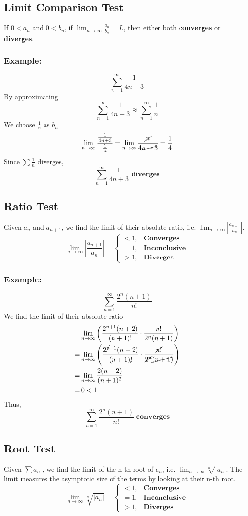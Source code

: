 \documentclass[11pt]{article}
\begin{document}
\subsection{Limit Comparison Test}
If $0<a_n$ and $0<b_n$, if $\displaystyle\lim_{n\to\infty}\frac{a_n}{b_n}=L$, then either both \textbf{converges} or \textbf{diverges}.
\subsubsection*{Example:}
\[
  \sum_{n=1}^\infty \frac{1}{4n+3}
\]
By approximating
\[
  \displaystyle\sum_{n=1}^\infty \frac{1}{4n+3} \approx \sum_{n=1}^\infty \frac{1}{n}
\]
We choose $\displaystyle\frac{1}{n}$ as $b_n$
\[
  \lim_{n\to\infty} \frac{\frac{1}{4n+3}}{\frac{1}{n}}=\lim_{n\to\infty}\frac{\cancel{n}}{4\cancel{n+3}}=\frac{1}{4}
\]
Since $\displaystyle\sum\frac{1}{n}$ diverges,
\[
  \sum_{n=1}^\infty \frac{1}{4n+3}\textbf{ diverges}
\]
\subsection{Ratio Test}
Given $a_n$ and $a_{n+1}$, we find the limit of their absolute ratio, i.e. $\displaystyle\lim_{n\to\infty}\left|\frac{a_{n+1}}{a_n}\right|$. 
\[
  \lim_{n\to\infty}\left|\frac{a_{n+1}}{a_n}\right|=
  \begin{cases}
    <1, &\textbf{Converges}\\
    =1, &\textbf{Inconclusive}\\
    >1, &\textbf{Diverges}
  \end{cases}
\]
\subsubsection*{Example:}
\[
  \sum_{n=1}^\infty \frac{2^n(n+1)}{n!}
\]
We find the limit of their absolute ratio
\[
  \begin{aligned}
    &\lim_{n\to\infty} \left(\frac{2^{n+1}(n+2)}{(n+1)!}\cdot\frac{n!}{2^n(n+1)}\right)\\
    =&\lim_{n\to\infty} \left(
        \frac{2^{\cancel{n}+1}(n+2)}{(n+1)\cancel{!}}\cdot\frac{\cancel{n!}}{\cancel{2^n}\cancel{(n+1)}}
      \right)\\
    =&\lim_{n\to\infty}\frac{2(n+2)}{(n+1)^2}\\
    =&\,0<1
  \end{aligned}
\]
Thus,
\[
  \sum_{n=1}^\infty \frac{2^n(n+1)}{n!}\textbf{ converges}
\]
\subsection{Root Test}
Given $\displaystyle\sum a_n$ , we find the limit of the n-th root of $a_n$, i.e. $\displaystyle\lim_{n\to\infty}\sqrt[n]{\left|{a_n}\right|}$.
The limit measures the asymptotic size of the terms by looking at their n-th root.
\[
  \lim_{n\to\infty}\sqrt[n]{\left|{a_n}\right|}=
  \begin{cases}
    <1, &\textbf{Converges}\\
    =1, &\textbf{Inconclusive}\\
    >1, &\textbf{Diverges}
  \end{cases}
\]
\end{document}
